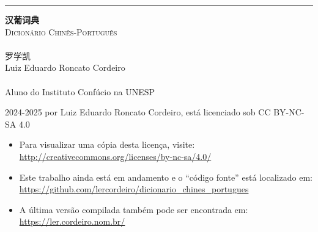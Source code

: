 
\begin{titlingpage}
  \raggedleft
  \rule{1pt}{\textheight}
  \hspace{0.1\textwidth}
  \parbox[b]{0.75\textwidth}{
    \vspace{0.05\textheight}
    {\HUGE\bfseries 汉葡词典}\\[2\baselineskip] %
    {\Large\textsc{Dicionário Chinês-Português}\\%
     \large\textsc{\zhtoday}}\\%
    [4\baselineskip]
    {\Large\textsc{罗学凯}\\%
     \small Luiz Eduardo Roncato Cordeiro}\\%
    \vspace{0.5\textheight}\\%
    {Aluno do Instituto Confúcio na UNESP}\\[\baselineskip] %
  }
  \newpage
  \raggedright
  \setlength{\parindent}{0pt}
  \setlength{\parskip}{\baselineskip}
  \mbox{}
  \vfill
  \footnotesize
  \textcopyright{} 2024-2025 por Luiz Eduardo Roncato Cordeiro, está licenciado sob CC BY-NC-SA 4.0\\
  \begin{itemize}
    \item Para visualizar uma cópia desta licença, visite:\\ \url{http://creativecommons.org/licenses/by-nc-sa/4.0/}
    \item Este trabalho ainda está em andamento e o ``código fonte'' está localizado em:\\ \url{https://github.com/lercordeiro/dicionario_chines_portugues}
    \item A última versão compilada também pode ser encontrada em:\\ \url{https://ler.cordeiro.nom.br/}
  \end{itemize}
\end{titlingpage}

